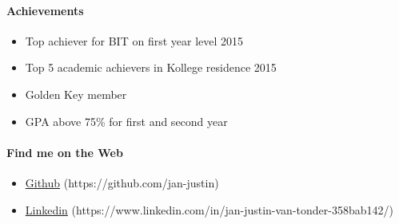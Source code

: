 \documentclass{article}
\begin{document}
        \paragraph{Achievements}
            \begin{itemize}
                \item Top achiever for BIT on first year level 2015
                \item Top 5 academic achievers in Kollege residence 2015
                \item Golden Key member
                \item GPA above 75\% for first and second year
            \end{itemize}
            
        \paragraph{Find me on the Web}
            \begin{itemize}
                \item \href{https://github.com/jan-justin}{Github} (https://github.com/jan-justin)
                \item \href{https://www.linkedin.com/in/jan-justin-van-tonder-358bab142/}{Linkedin} (https://www.linkedin.com/in/jan-justin-van-tonder-358bab142/)
            \end{itemize}
\end{document}
